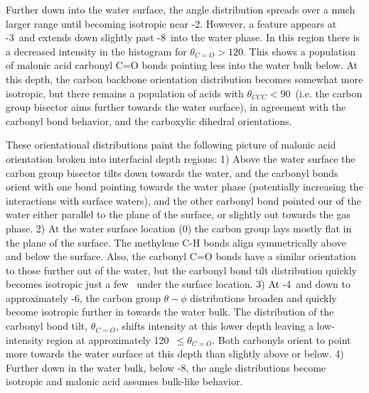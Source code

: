Further down into the water surface, the angle distribution spreads over a much larger range until becoming isotropic near -2\angs. However, a feature appears at -3\angs~and extends down slightly past -8\angs~into the water phase. In this region there is a decreased intensity in the histogram for $\theta_{C=O} > 120$\textdegree. This shows a population of malonic acid carbonyl C=O bonds pointing less into the water bulk below. At this depth, the carbon backbone orientation distribution becomes somewhat more isotropic, but there remains a population of acids with $\theta_{CCC} < 90$\textdegree~(i.e. the carbon group bisector aims further towards the water surface), in agreement with the carbonyl bond behavior, and the carboxylic dihedral orientations.

These orientational distributions paint the following picture of malonic acid orientation broken into interfacial depth regions: 1) Above the water surface the carbon group bisector tilts down towards the water, and the carbonyl bonds orient with one bond pointing towards the water phase (potentially increasing the interactions with surface waters), and the other carbonyl bond pointed our of the water either parallel to the plane of the surface, or slightly out towards the gas phase. 2) At the water surface location (0\angs) the carbon group lays mostly flat in the plane of the surface. The methylene C-H bonds align symmetrically above and below the surface. Also, the carbonyl C=O bonds have a similar orientation to those further out of the water, but the carbonyl bond tilt distribution quickly becomes isotropic just a few \angs~under the surface location. 3) At -4\angs~and down to approximately -6\angs, the carbon group $\theta-\phi$ distributions broaden and quickly become isotropic further in towards the water bulk. The distribution of the carbonyl bond tilt, $\theta_{C=O}$, shifts intensity at this lower depth leaving a low-intensity region at approximately 120\textdegree~$\le \theta_{C=O}$. Both carbonyls orient to point more towards the water surface at this depth than slightly above or below. 4) Further down in the water bulk, below -8\angs, the angle distributions become isotropic and malonic acid assumes bulk-like behavior.
